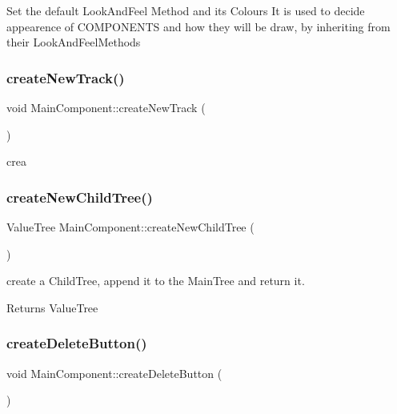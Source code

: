 Set the default Look\+And\+Feel Method and its Colours It is used to decide appearence of C\+O\+M\+P\+O\+N\+E\+N\+TS and how they will be draw, by inheriting from their Look\+And\+Feel\+Methods \mbox{\label{class_main_component_a37ad1936a014ef9402641eb9a6a0cecf}} 
\subsubsection{\texorpdfstring{createNewTrack()}{createNewTrack()}}
{\footnotesize\ttfamily void Main\+Component\+::create\+New\+Track (\begin{DoxyParamCaption}{ }\end{DoxyParamCaption})}

crea \mbox{\label{class_main_component_aabdd825c15b28c53ce5b506223293e39}} 
\subsubsection{\texorpdfstring{createNewChildTree()}{createNewChildTree()}}
{\footnotesize\ttfamily Value\+Tree Main\+Component\+::create\+New\+Child\+Tree (\begin{DoxyParamCaption}{ }\end{DoxyParamCaption})}

create a Child\+Tree, append it to the Main\+Tree and return it. \begin{DoxyReturn}{Returns}
Value\+Tree 
\end{DoxyReturn}
\mbox{\label{class_main_component_a6932ee4943e32ec7c180c4ae95866794}} 
\subsubsection{\texorpdfstring{createDeleteButton()}{createDeleteButton()}}
{\footnotesize\ttfamily void Main\+Component\+::create\+Delete\+Button (\begin{DoxyParamCaption}{ }\end{DoxyParamCaption})}

